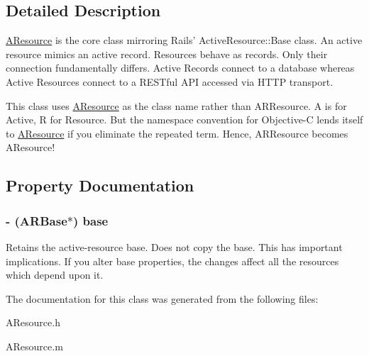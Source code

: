\subsection{\-Detailed \-Description}
\hyperlink{interface_a_resource}{\-A\-Resource} is the core class mirroring \-Rails' \-Active\-Resource\-::\-Base class. \-An active resource mimics an active record. \-Resources behave as records. \-Only their connection fundamentally differs. \-Active \-Records connect to a database whereas \-Active \-Resources connect to a \-R\-E\-S\-Tful \-A\-P\-I accessed via \-H\-T\-T\-P transport.

\-This class uses \hyperlink{interface_a_resource}{\-A\-Resource} as the class name rather than \-A\-R\-Resource. \-A is for \-Active, \-R for \-Resource. \-But the namespace convention for \-Objective-\/\-C lends itself to \hyperlink{interface_a_resource}{\-A\-Resource} if you eliminate the repeated term. \-Hence, \-A\-R\-Resource becomes \-A\-Resource! 

\subsection{\-Property \-Documentation}
\hypertarget{interface_a_resource_a30040e9c47eb757de009e84ef1afb538}{
\subsubsection[{base}]{\setlength{\rightskip}{0pt plus 5cm}-\/ ({\bf \-A\-R\-Base}$\ast$) base}}
\label{interface_a_resource_a30040e9c47eb757de009e84ef1afb538}
\-Retains the active-\/resource base. \-Does not copy the base. \-This has important implications. \-If you alter base properties, the changes affect all the resources which depend upon it. 

\-The documentation for this class was generated from the following files\-:\begin{DoxyCompactItemize}
\item 
\-A\-Resource.\-h\item 
\-A\-Resource.\-m\end{DoxyCompactItemize}
